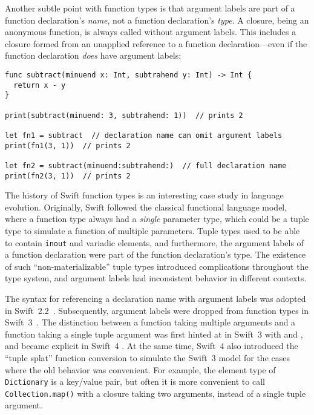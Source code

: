 \documentclass[../generics]{subfiles}
\begin{document}
Another subtle point with function types is that argument labels are part of a function declaration's \emph{name}, not a function declaration's \emph{type}. A closure, being an anonymous function, is always called without argument labels. This includes a closure formed from an unapplied reference to a function declaration---even if the function declaration \emph{does} have argument labels:
\begin{Verbatim}
func subtract(minuend x: Int, subtrahend y: Int) -> Int {
  return x - y
}

print(subtract(minuend: 3, subtrahend: 1))  // prints 2

let fn1 = subtract  // declaration name can omit argument labels
print(fn1(3, 1))  // prints 2

let fn2 = subtract(minuend:subtrahend:)  // full declaration name
print(fn2(3, 1))  // prints 2
\end{Verbatim}

The history of Swift function types is an interesting case study in language evolution. Originally, Swift followed the classical functional language model, where a function type always had a \emph{single} parameter type, which could be a tuple type to simulate a function of multiple parameters. Tuple types used to be able to contain \texttt{inout} and variadic elements, and furthermore, the argument labels of a function declaration were part of the function declaration's type. The existence of such ``non-materializable'' tuple types introduced complications throughout the type system, and argument labels had inconsistent behavior in different contexts.

The syntax for referencing a declaration name with argument labels was adopted in Swift~2.2~\cite{se0021}. Subsequently, argument labels were dropped from function types in Swift~3~\cite{se0111}. The distinction between a function taking multiple arguments and a function taking a single tuple argument was first hinted at in Swift~3 with \cite{se0029} and \cite{se0066}, and became explicit in Swift~4 \cite{se0110}. At the same time, Swift~4 also introduced the ``tuple splat'' function conversion to simulate the Swift~3 model for the cases where the old behavior was convenient. For example, the element type of \texttt{Dictionary} is a key/value pair, but often it is more convenient to call \texttt{Collection.map()} with a closure taking two arguments, instead of a single tuple argument.
\end{document}
